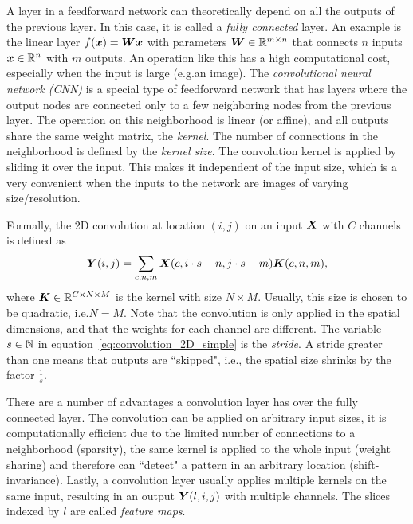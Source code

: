 		A layer in a feedforward network can theoretically depend on all the outputs of the previous layer.
		In this case, it is called a \emph{fully connected} layer.
		An example is the linear layer $f(\bm{x}) = \bm{W} \bm{x}$ with parameters $\bm{W} \in \mathbb{R}^{m \times n}$ that connects $n$ inputs $\bm{x} \in \mathbb{R}^n$ with $m$ outputs.
		An operation like this has a high computational cost, especially when the input is large (e.g.\@ an image).
		The \emph{convolutional neural network (CNN)} is a special type of feedforward network that has layers where the output nodes are connected only to a few neighboring nodes from the previous layer.
		The operation on this neighborhood is linear (or affine), and all outputs share the same weight matrix, the \emph{kernel}.
		The number of connections in the neighborhood is defined by the \emph{kernel size}.
		The convolution kernel is applied by sliding it over the input.
		This makes it independent of the input size, which is a very convenient when the inputs to the network are images of varying size/resolution.
		
		Formally, the 2D convolution at location $(i, j)$ on an input $\bm{X}$ with $C$ channels is defined as 
		\begin{equation}\label{eq:convolution_2D_simple}
			\bm{Y}(i, j) = 
			\sum_{c, n, m}
				\bm{X}(c, i \cdot s - n, j \cdot s - m) \bm{K}(c, n, m), 
		\end{equation}
		where $\bm{K} \in \mathbb{R}^{C \times N \times M}$ is the kernel with size $N \times M$.
		Usually, this size is chosen to be quadratic, i.e.\@ $N = M$.
		Note that the convolution is only applied in the spatial dimensions, and that the weights for each channel are different.
		The variable $s \in \mathbb{N}$ in equation~\ref{eq:convolution_2D_simple} is the \emph{stride}.
		A stride greater than one means that outputs are ``skipped", i.e., the spatial size shrinks by the factor $\frac{1}{s}$.
		
		There are a number of advantages a convolution layer has over the fully connected layer.
		The convolution can be applied on arbitrary input sizes, it is computationally efficient due to the limited number of connections to a neighborhood (sparsity), the same kernel is applied to the whole input (weight sharing) and therefore can ``detect" a pattern in an arbitrary location (shift-invariance).
		Lastly, a convolution layer usually applies multiple kernels on the same input, resulting in an output $\bm{Y}(l, i, j)$ with multiple channels.
		The slices indexed by $l$ are called \emph{feature maps}.
		

